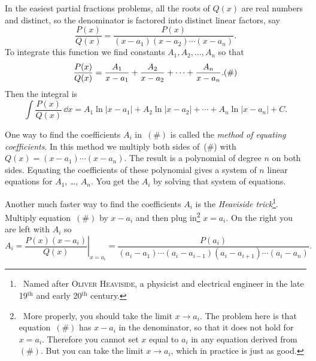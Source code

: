 In the easiest partial fractions problems, all the roots of $Q(x)$ are real
numbers and distinct, so the denominator is factored into distinct linear
factors, say
\[
\frac{P(x)}{Q(x)} = \frac{P(x)}{(x-a_1)(x-a_2)\cdots(x-a_n)}.
\]
To integrate this function we find constants $A_1,A_2,\ldots,A_n$ so that
\[
\frac{P(x)}{Q(x)} = \frac{A_1}{x-a_1} + \frac{A_2}{x-a_2}+\cdots+
\frac{A_n}{x-a_n}.  \relax(\#)
\]
Then the integral is
\[
\int \frac{P(x)}{Q(x)}\,\dd x =
A_1\ln|x-a_1|+A_2\ln|x-a_2|+\cdots+A_n\ln|x-a_n|+C.
\]


One way to find the coefficients $A_i$ in~$(\#)$ is called the \emph{method of
  equating coefficients}.  In this method we multiply both sides of~(\#) with
$Q(x) = (x-a_1)\cdots (x-a_n)$. The result is a polynomial of degree $n$ on both
sides. Equating the coefficients of these polynomial gives a system of $n$
linear equations for $A_1$, \ldots, $A_n$. You get the $A_i$ by solving that
system of equations.

Another much faster way to find the coefficients $A_i$ is the \emph{Heaviside
  trick}\footnote{~Named after \textsc{Oliver Heaviside}, a physicist and
  electrical engineer in the late 19$^{\mathrm{th}}$ and early
  20$^{\mathrm{th}}$ century.}.  Multiply equation~$(\#)$ by $x-a_i$ and then
plug in\footnote{~More properly, you should take the limit $x\to a_i$.  The
  problem here is that equation~$(\#)$ has $x-a_i$ in the denominator, so that
  it does not hold for $x=a_i$.  Therefore you cannot set $x$ equal to $a_i$ in
  any equation derived from~$(\#)$.  But you can take the limit $x\to a_i$,
  which in practice is just as good.}  $x=a_i$.  On the right you are left with
$A_i$ so
\[
A_i=\left.\frac{P(x)(x-a_i)}{Q(x)}\right|_{x=a_i}=
\frac{P(a_i)}{(a_i-a_1)\cdots(a_i-a_{i-1})(a_i-a_{i+1})\cdots(a_i-a_n)}.
\]
